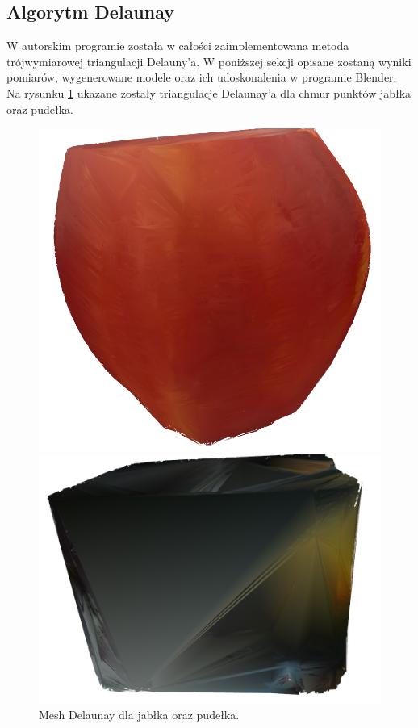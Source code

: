 \subsection{Algorytm Delaunay}
W autorskim programie została w całości zaimplementowana metoda trójwymiarowej triangulacji Delauny'a. W poniższej sekcji opisane zostaną wyniki pomiarów, wygenerowane modele oraz ich udoskonalenia w programie Blender. Na rysunku \ref{fig:delaBoxApple} ukazane zostały triangulacje Delaunay'a dla chmur punktów jabłka oraz pudełka.
\begin{figure}[H]
\centering
    \begin{minipage}[b]{0.45\linewidth}
        \includegraphics[scale=0.4]{jablkoDelNowe.PNG}
    \end{minipage}
\quad
    \begin{minipage}[b]{0.45\linewidth}
        \includegraphics[scale=0.4]{delaunayBox.PNG}
    \end{minipage}
\caption{Mesh Delaunay dla jabłka oraz pudełka.}
\label{fig:delaBoxApple}
\end{figure}
